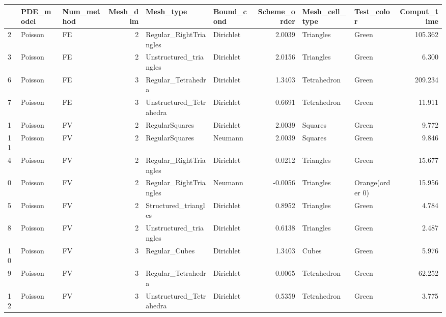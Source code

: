 \begin{tabular}{lllrllrllr}
\toprule
{} & PDE\_model & Num\_method &  Mesh\_dim &                Mesh\_type & Bound\_cond &  Scheme\_order & Mesh\_cell\_type &       Test\_color &  Comput\_time \\
\midrule
2  &   Poisson &         FE &         2 &   Regular\_RightTriangles &  Dirichlet &        2.0039 &      Triangles &            Green &      105.362 \\
3  &   Poisson &         FE &         2 &   Unstructured\_triangles &  Dirichlet &        2.0156 &      Triangles &            Green &        6.300 \\
6  &   Poisson &         FE &         3 &       Regular\_Tetrahedra &  Dirichlet &        1.3403 &    Tetrahedron &            Green &      209.234 \\
7  &   Poisson &         FE &         3 &  Unstructured\_Tetrahedra &  Dirichlet &        0.6691 &    Tetrahedron &            Green &       11.911 \\
1  &   Poisson &         FV &         2 &           RegularSquares &  Dirichlet &        2.0039 &        Squares &            Green &        9.772 \\
11 &   Poisson &         FV &         2 &           RegularSquares &    Neumann &        2.0039 &        Squares &            Green &        9.846 \\
4  &   Poisson &         FV &         2 &   Regular\_RightTriangles &  Dirichlet &        0.0212 &      Triangles &            Green &       15.677 \\
0  &   Poisson &         FV &         2 &   Regular\_RightTriangles &    Neumann &       -0.0056 &      Triangles &  Orange(order 0) &       15.956 \\
5  &   Poisson &         FV &         2 &     Structured\_triangles &  Dirichlet &        0.8952 &      Triangles &            Green &        4.784 \\
8  &   Poisson &         FV &         2 &   Unstructured\_triangles &  Dirichlet &        0.6138 &      Triangles &            Green &        2.487 \\
10 &   Poisson &         FV &         3 &            Regular\_Cubes &  Dirichlet &        1.3403 &          Cubes &            Green &        5.976 \\
9  &   Poisson &         FV &         3 &       Regular\_Tetrahedra &  Dirichlet &        0.0065 &    Tetrahedron &            Green &       62.252 \\
12 &   Poisson &         FV &         3 &  Unstructured\_Tetrahedra &  Dirichlet &        0.5359 &    Tetrahedron &            Green &        3.775 \\
\bottomrule
\end{tabular}

